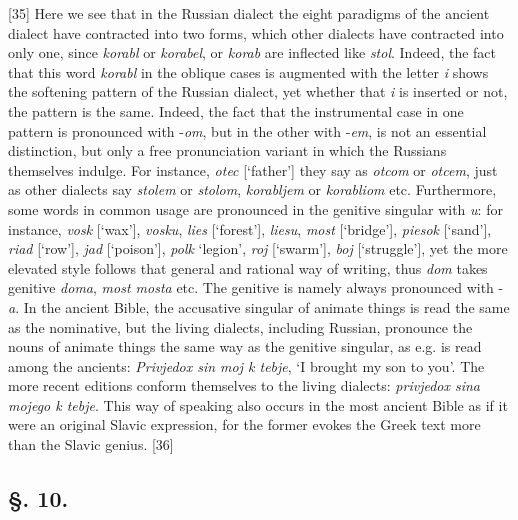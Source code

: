 [35] Here we see that in the Russian dialect the eight paradigms of the ancient dialect have contracted into two forms, which other dialects have contracted into only one, since \textit{korabl} or \textit{korabel}, or \textit{korab} are inflected like \textit{stol}. Indeed, the fact that this word \textit{korabl} in the oblique cases is augmented with the letter \textit{i} shows the softening pattern of the Russian dialect, yet whether that \textit{i} is inserted or not, the pattern is the same. Indeed, the fact that the instrumental case in one pattern is pronounced with -\textit{om}, but in the other with -\textit{em}, is not an essential distinction, but only a free pronunciation variant in which the Russians themselves indulge. For instance, \textit{otec} [‘father’] they say as \textit{otcom} or \textit{otcem}, just as other dialects say \textit{stolem} or \textit{stolom}, \textit{korabljem} or \textit{korabliom} etc. Furthermore, some words in common usage are pronounced in the genitive singular with \textit{u}: for instance, \textit{vosk} [‘wax’], \textit{vosku}, \textit{lies} [‘forest’], \textit{liesu}, \textit{most} [‘bridge’], \textit{piesok} [‘sand’], \textit{riad} [‘row’], \textit{jad} [‘poison’], \textit{polk} ‘legion’, \textit{roj} [‘swarm’], \textit{boj} [‘struggle’], yet the more elevated style follows that general and rational way of writing, thus \textit{dom} takes genitive \textit{doma}, \textit{most mosta} etc. The genitive is namely always pronounced with -\textit{a}. In the ancient Bible, the accusative singular of animate things is read the same as the nominative, but the living dialects, including Russian, pronounce the nouns of animate things the same way as the genitive singular, as e.g. is read among the ancients: \textit{Privjedox sin moj k tebje}, ‘I brought my son to you’. The more recent editions conform themselves to the living dialects: \textit{privjedox sina mojego k tebje}. This way of speaking also occurs in the most ancient Bible as if it were an original Slavic expression, for the former evokes the Greek text more than the Slavic genius. [36]

\subsection*{\hspace*{\fill}§. 10.\hspace*{\fill}}

